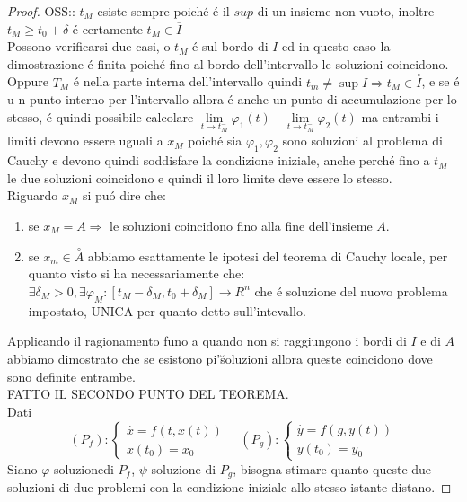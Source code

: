 \begin{proof}
	OSS:: $t_M$ esiste sempre poich\'e \'e il $sup$ di un insieme non vuoto, inoltre $t_M\ge t_0+\delta$ \'e certamente $t_M\in \overline{I}$\\
	Possono verificarsi due casi, o $t_M$ \'e sul bordo di $I$ ed in questo caso la dimostrazione \'e finita poich\'e fino al bordo dell'intervallo le soluzioni coincidono.
	Oppure $T_M$ \'e nella parte interna dell'intervallo quindi $t_m\ne\sup I\Rightarrow t_M\in\overset{\circ}{I}$, e se \'e u n punto interno per l'intervallo allora \'e anche un punto di accumulazione per lo stesso, \'e quindi possibile calcolare $\lim\limits_{t\to t_M^{-}}\varphi_1(t)\quad\lim\limits_{t\to t_M^{-}}\varphi_2(t)$ ma entrambi i limiti devono essere uguali a $x_M$ poich\'e sia $\varphi_1,\varphi_2$ sono soluzioni al problema  di Cauchy e devono quindi soddisfare la condizione iniziale, anche perch\'e fino a $t_M$ le due soluzioni coincidono e quindi il loro limite deve essere lo stesso.\\
	Riguardo $x_M$ si pu\'o dire che:
	\begin{enumerate}
		\item se $x_M = A\Rightarrow$ le soluzioni coincidono fino alla fine dell'insieme $A$.
		\item se $x_m\in\overset{\circ}{A}$ abbiamo esattamente le ipotesi del teorema di Cauchy locale, per quanto visto si ha necessariamente che:\\
		$\exists \delta_M>0,\exists \varphi_M:\left[t_M-\delta_M,t_0+\delta_M\right]\to R^n$ che \'e soluzione del nuovo problema impostato, UNICA per quanto detto sull'intevallo.
	\end{enumerate} 
	Applicando il ragionamento funo a quando non si raggiungono i bordi di $I$ e di $A$ abbiamo dimostrato che se esistono pi'\u soluzioni allora queste coincidono dove sono definite entrambe.\\
	FATTO IL SECONDO PUNTO DEL TEOREMA.\\
	Dati
	$$(P_f):\left\{\begin{matrix}\overset{\cdot}{x}=f(t,x(t))\\x(t_0)=x_{0}\end{matrix}\right.\quad	(P_g):\left\{\begin{matrix}\overset{\cdot}{y}=f(g,y(t))\\y(t_0)=y_{0}\end{matrix}\right.$$
	Siano $\varphi$ soluzionedi $P_f$, $\psi$ soluzione di $P_g$, bisogna stimare quanto queste due soluzioni di due problemi con la condizione iniziale allo stesso istante distano.

\end{proof}

